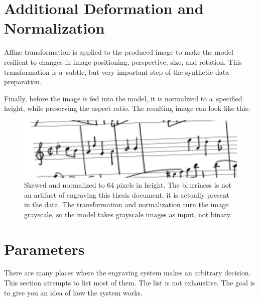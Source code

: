 \section{Additional Deformation and Normalization}

Affine transformation is applied to the produced image to make the model resilient to changes in image positioning, perspective, size, and rotation. This transformation is a~subtle, but very important step of the synthetic data preparation.

Finally, before the image is fed into the model, it is normalized to a~specified height, while preserving the aspect ratio. The resulting image can look like this:

\begin{figure}[h]
    \centering
    \includegraphics[width=120mm]{../img/normalized-image}
    \caption{Skewed and normalized to 64 pixels in height. The blurriness is not an artifact of engraving this thesis document, it is actually present in the data. The transformation and normalization turn the image grayscale, so the model takes grayscale images as input, not binary.}
    \label{fig5:NormalizedImage}
\end{figure}


\section{Parameters}

There are many places where the engraving system makes an arbitrary decision. This section attempts to list most of them. The list is not exhaustive. The goal is to give you an idea of how the system works.

